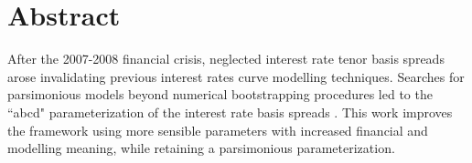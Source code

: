 \chapter*{Abstract}
After the 2007-2008 financial crisis, neglected interest rate tenor basis spreads arose invalidating previous interest rates curve modelling techniques.
Searches for parsimonious models beyond numerical bootstrapping procedures led to the ``abcd" parameterization of the interest rate basis spreads \cite{ametrano_ballabio_mazzocchi}.
This work improves the framework using more sensible parameters with increased financial and modelling meaning, while retaining a parsimonious parameterization.


